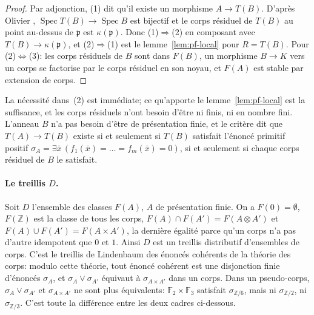 \begin{proof}
Par adjonction, (1) dit qu'il existe un morphisme $A\to T(B)$. D'après Olivier \cite{olivier}, $\operatorname{Spec}T(B)\to\operatorname{Spec}B$ est bijectif et le corps résiduel de $T(B)$ au point au-dessus de $\mathfrak p$ est $\kappa(\mathfrak p)$. Donc (1)$\Rightarrow$(2) en composant avec $T(B)\to\kappa(\mathfrak p)$, et (2)$\Rightarrow$(1) est le lemme~\ref{lem:pf-local} pour $R = T(B)$. Pour (2)$\Leftrightarrow$(3): les corps résiduels de $B$ sont dans $F(B)$, un morphisme $B\to K$ vers un corps se factorise par le corps résiduel en son noyau, et $F(A)$ est stable par extension de corps.
\end{proof}

La nécessité dans~(2) est immédiate; ce qu'apporte le lemme~\ref{lem:pf-local} est la suffisance, et les corps résiduels n'ont besoin d'être ni finis, ni en nombre fini. L'anneau $B$ n'a pas besoin d'être de présentation finie, et le critère dit que $T(A)\to T(B)$ existe si et seulement si $T(B)$ satisfait l'énoncé primitif positif $\sigma_A = \exists\bar x\,(f_1(\bar x) = \dots = f_m(\bar x) = 0)$, si et seulement si chaque corps résiduel de $B$ le satisfait.

\paragraph{Le treillis $D$.} Soit $D$ l'ensemble des classes $F(A)$, $A$ de présentation finie. On a $F(0) = \emptyset$, $F(\mathbb Z)$ est la classe de tous les corps, $F(A)\cap F(A') = F(A\otimes A')$ et $F(A)\cup F(A') = F(A\times A')$, la dernière égalité parce qu'un corps n'a pas d'autre idempotent que $0$ et $1$. Ainsi $D$ est un treillis distributif d'ensembles de corps. C'est le treillis de Lindenbaum des énoncés cohérents de la théorie des corps: modulo cette théorie, tout énoncé cohérent est une disjonction finie d'énoncés $\sigma_A$, et $\sigma_A\vee\sigma_{A'}$ équivaut à $\sigma_{A\times A'}$ dans un corps. Dans un pseudo-corps, $\sigma_A\vee\sigma_{A'}$ et $\sigma_{A\times A'}$ ne sont plus équivalents: $\mathbb F_2\times\mathbb F_3$ satisfait $\sigma_{\mathbb Z/6}$, mais ni $\sigma_{\mathbb Z/2}$, ni $\sigma_{\mathbb Z/3}$. C'est toute la différence entre les deux cadres ci-dessous.

